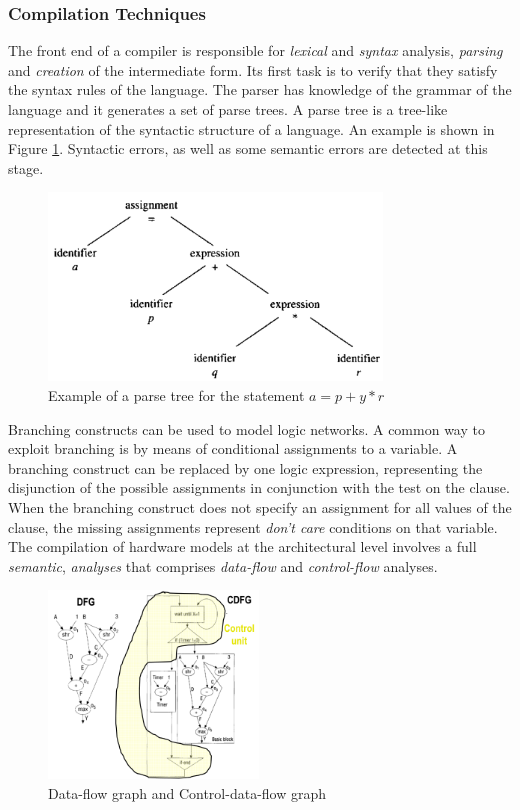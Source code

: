 \subsubsection{Compilation  Techniques}
The front end of a compiler is responsible for  \textit{lexical}  and  \textit{syntax} analysis, \textit{parsing}  and \textit{creation} of the intermediate form. Its first task is to verify that they satisfy the syntax rules of the language. The parser has knowledge of the grammar of the language and it generates a set of  parse trees.  A parse tree is a tree-like representation of the syntactic structure of a language. An example is shown in Figure \ref{fig:parseTree}. Syntactic errors, as well as some semantic errors are detected at this stage.
\begin{figure}[H]
	 \centering
	 \includegraphics[height=50mm]{./Cap3/Images/Image03.png}
	 \caption[Optional caption]{Example  of  a  parse  tree  for  the statement  $ a  =  p  +  y  *  r $}
	 \label{fig:parseTree}
\end{figure}
Branching constructs can be used to model logic networks. A common way to exploit branching is by means of conditional assignments to a variable.  A  branching construct can be replaced by one logic expression, representing the disjunction of the possible assignments in conjunction with the test on the clause. When the branching construct does not specify an assignment for all values of the clause, the missing assignments represent  \textit{don't  care}  conditions on that variable. The compilation of hardware models at the architectural level involves a full \textit{semantic}, \textit{analyses}  that comprises  \textit{data-flow}  and  \textit{control-flow}  analyses.
\begin{figure}[H]
	 \centering
	 \includegraphics[height=50mm]{./Cap3/Images/Image04.png}
	 \caption[Optional caption]{Data-flow graph and Control-data-flow graph}
	 \label{fig:dataFlow}
\end{figure}

